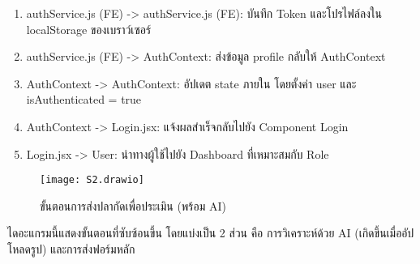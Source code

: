 \begin{sloppypar}
\begin{enumerate}
\begin{enumerate}
			\item authService.js (FE) -> authService.js (FE): บันทึก Token และโปรไฟล์ลงใน localStorage ของเบราว์เซอร์
			\item authService.js (FE) -> AuthContext: ส่งข้อมูล profile กลับให้ AuthContext
			\item AuthContext -> AuthContext: อัปเดต state ภายใน โดยตั้งค่า user และ isAuthenticated = true
			\item AuthContext -> Login.jsx: แจ้งผลสำเร็จกลับไปยัง Component Login
			\item Login.jsx -> User: นำทางผู้ใช้ไปยัง Dashboard ที่เหมาะสมกับ Role
		\end{enumerate}
	\end{enumerate}
\end{sloppypar}

\newpage

\begin{figure}[h]
	\centering
	\texttt{[image: S2.drawio]}
	\caption{ขั้นตอนการส่งปลากัดเพื่อประเมิน (พร้อม AI)}
\end{figure}

\indent ไดอะแกรมนี้แสดงขั้นตอนที่ซับซ้อนขึ้น โดยแบ่งเป็น 2 ส่วน คือ การวิเคราะห์ด้วย AI (เกิดขึ้นเมื่ออัปโหลดรูป) และการส่งฟอร์มหลัก

